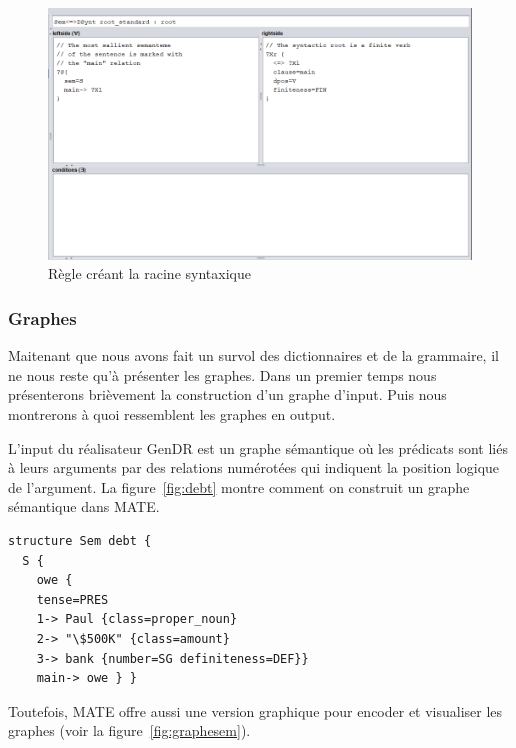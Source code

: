 \begin{figure}[htb]
	\centering
	\includegraphics[width=1\textwidth, trim = {0cm 0cm 0cm 0cm},clip]{ch3/figs/grammaire.png}
	\caption{Règle créant la racine syntaxique}
	\label{fig:root}
\end{figure}


\subsubsection{Graphes}\label{entree-sortie}

Maitenant que nous avons fait un survol des dictionnaires et de la grammaire, il ne nous reste qu'à présenter les graphes. Dans un premier temps nous présenterons brièvement la construction d'un graphe d'input. Puis nous montrerons à quoi ressemblent les graphes en output.

L'input du réalisateur GenDR est un graphe sémantique \citep{mel2012semantics} où les prédicats sont liés à leurs arguments par des relations numérotées qui indiquent la position logique de l'argument. La figure~\ref{fig:debt} montre comment on construit un graphe sémantique dans MATE.

\begin{lstlisting}[language=mate, caption = Graphe sémantique en mode textuel, label=fig:debt]
structure Sem debt {
  S {
    owe {
    tense=PRES
    1-> Paul {class=proper_noun}
    2-> "\$500K" {class=amount}
    3-> bank {number=SG definiteness=DEF}}
    main-> owe } }
\end{lstlisting}

Toutefois, MATE offre aussi une version graphique pour encoder et visualiser les graphes (voir la figure~\ref{fig:graphesem}).

